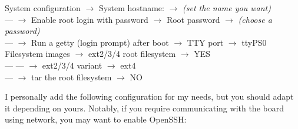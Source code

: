 \documentclass[openany,a4paper]{book}
\begin{document}
\begin{tabbing}
\> System configuration               \> $\rightarrow$ System hostname:                              \>                                                          \> $\rightarrow$ \textit{(set the name you want)} \\
\> ---                                \> $\rightarrow$ Enable root login with password               \>\>\> $\rightarrow$ Root password                          \> $\rightarrow$ \textit{(choose a password)} \\
\> ---                                \> $\rightarrow$ Run a getty (login prompt) after boot         \>                                                          \>\> $\rightarrow$ TTY port  \> $\rightarrow$ ttyPS0 \\
\> Filesystem images                  \> $\rightarrow$ ext2/3/4 root filesystem                      \>                                                          \> $\rightarrow$ YES \\
\> ---                                \>  ---                                                        \>                                                          \> $\rightarrow$ ext2/3/4 variant                           \> $\rightarrow$ ext4 \\
\> ---                                \> $\rightarrow$ tar the root filesystem                       \>                                                          \> $\rightarrow$ NO \\
\end{tabbing}

I personally add the following configuration for my needs, but you should adapt it depending on yours.
Notably, if you require communicating with the board using network, you may want to enable OpenSSH:
\end{document}
